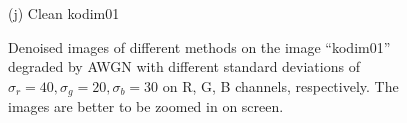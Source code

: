 \documentclass[10pt,onecolumn,letterpaper]{article}
\begin{document}
\begin{figure}
{\begin{minipage}[t]{0.195\textwidth}
{\footnotesize (j) Clean kodim01}
\end{minipage}
}
\caption{Denoised images of different methods on the image ``kodim01'' degraded by AWGN with different standard deviations of $\sigma_{r}=40, \sigma_{g}=20, \sigma_{b}=30$ on R, G, B channels, respectively. The images are better to be zoomed in on screen.}
\label{f1}
\vspace{2mm}
\end{figure}


\begin{figure}\vspace{1mm}
\centering
{}
\end{figure}
\end{document}
